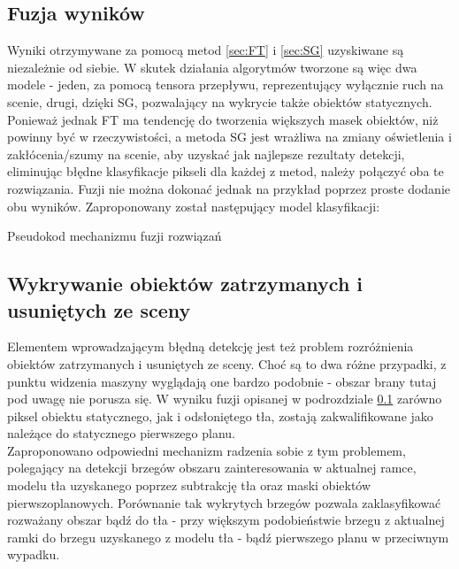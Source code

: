 \subsection{Fuzja wyników}
\label{sec:fuzja}
Wyniki otrzymywane za pomocą metod \ref{sec:FT} i \ref{sec:SG} uzyskiwane są niezależnie od siebie. W skutek działania algorytmów tworzone są więc dwa modele - jeden, za pomocą tensora przepływu, reprezentujący wyłącznie ruch na scenie, drugi, dzięki SG, pozwalający na wykrycie także obiektów statycznych. Ponieważ jednak FT ma tendencję do tworzenia większych masek obiektów, niż powinny być w rzeczywistości, a metoda SG jest wrażliwa na zmiany oświetlenia i zakłócenia/szumy na scenie, aby uzyskać jak najlepsze rezultaty detekcji, eliminując błędne klasyfikacje pikseli dla każdej z metod, należy połączyć oba te rozwiązania.  Fuzji nie można dokonać jednak na przykład poprzez proste dodanie obu wyników. Zaproponowany został następujący model klasyfikacji:
\begin{algorithm}[H]
 \caption{Pseudokod mechanizmu fuzji rozwiązań}
\end{algorithm}
\subsection{Wykrywanie obiektów zatrzymanych i usuniętych ze sceny}
Elementem wprowadzającym błędną detekcję jest też problem rozróżnienia obiektów zatrzymanych i usuniętych ze sceny. Choć są to dwa różne przypadki, z punktu widzenia maszyny wyglądają one bardzo podobnie - obszar brany tutaj pod uwagę nie porusza się. W wyniku fuzji opisanej w podrozdziale \ref{sec:fuzja} zarówno piksel obiektu statycznego, jak i odsłoniętego tła, zostają zakwalifikowane jako należące do statycznego pierwszego planu.\\
Zaproponowano odpowiedni mechanizm radzenia sobie z tym problemem, polegający na detekcji brzegów obszaru zainteresowania w aktualnej ramce, modelu tła uzyskanego poprzez subtrakcję tła oraz maski obiektów pierwszoplanowych. Porównanie tak wykrytych brzegów pozwala zaklasyfikować rozważany obszar bądź do tła - przy większym podobieństwie brzegu z aktualnej ramki do brzegu uzyskanego z modelu tła - bądź pierwszego planu w przeciwnym wypadku. 
